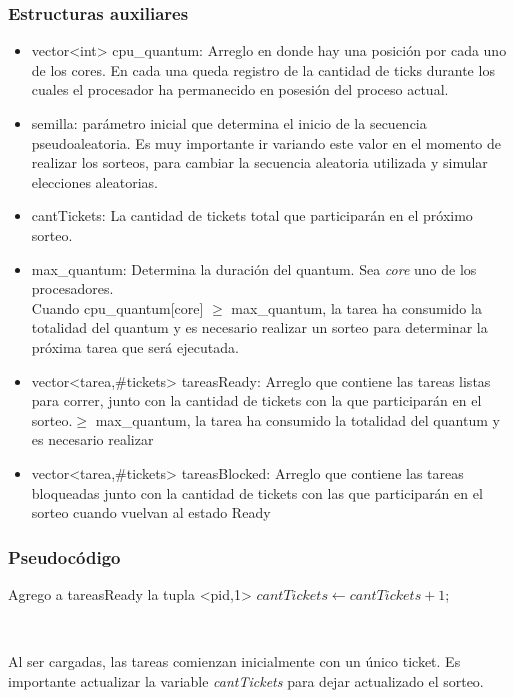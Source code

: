 \subsubsection{Estructuras auxiliares}

\begin{itemize}
  \item vector<int> cpu\_quantum: Arreglo en donde hay una posición por cada uno de los cores. En cada una queda registro de la cantidad de ticks durante los cuales el procesador ha permanecido
  en posesión del proceso actual. 
  \item semilla: parámetro inicial que determina el inicio de la secuencia pseudoaleatoria. Es muy importante ir variando este valor en el momento de 
  realizar los sorteos, para cambiar la secuencia aleatoria utilizada y simular elecciones aleatorias.
  \item cantTickets: La cantidad de tickets total que participarán en el próximo sorteo.
  \item max\_quantum: Determina la duración del quantum. Sea \emph{core} uno de los procesadores.\\ 
  Cuando cpu\_quantum[core] $\geq$ max\_quantum, la tarea ha consumido la totalidad del quantum y es necesario realizar
  un sorteo para determinar la próxima tarea que será ejecutada.
  \item vector<tarea,\#tickets> tareasReady: Arreglo que contiene las tareas listas para correr, junto con la cantidad de tickets con la que participarán en el sorteo.$\geq$ max\_quantum, la tarea ha consumido la totalidad del quantum y es necesario realizar
  \item vector<tarea,\#tickets> tareasBlocked: Arreglo que contiene las tareas bloqueadas junto con la cantidad de tickets con las que participarán en el sorteo cuando vuelvan al estado Ready
\end{itemize}

\subsubsection{Pseudocódigo}

\begin{algorithmic}
      \State Agrego a tareasReady la tupla <pid,1>
      \State $cantTickets \gets cantTickets+1$;
  \EndFunction
\end{algorithmic}

~

Al ser cargadas, las tareas comienzan inicialmente con un único ticket. Es importante actualizar la variable \emph{cantTickets} para dejar actualizado el sorteo.

